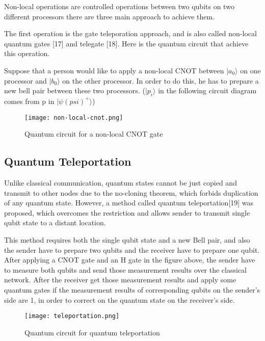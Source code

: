 Non-local operations are controlled operations between two qubits on two different processors there are three main approach to achieve them.

The first operation is the gate teleporation approach, and is also called non-local quantum gates [17] and telegate [18].  Here is the quantum circuit that achieve this operation.

Suppose that a person would like to apply a non-local CNOT between $|a_0\rangle$ on one processor and $|b_0\rangle$ on the other processor.  In order to do this, he has to prepare a new bell pair between these two processors.  ($|p_i\rangle$ in the following circuit diagram comes from p in $|\psi (psi)^+\rangle$)

 \begin{figure}[h]
  		\begin{center}
  			\texttt{[image: non-local-cnot.png]}
			\caption{Quantum circuit for a non-local CNOT gate}
			\label{Fig1}
		\end{center}
	\end{figure}
	
\newpage

\subsection{Quantum Teleportation}

  Unlike classical communication, quantum states cannot be just copied and transmit to other nodes due to the no-cloning theorem, which forbids duplication of any quantum state.  However, a method called quantum teleportation[19] was proposed, which overcomes the restriction and allows sender to transmit single qubit state to a distant location. 
 		
This method requires both the single qubit state and a new Bell pair, and also the sender have to prepare two qubits and the receiver have to prepare one qubit.  After applying a CNOT gate and an H gate in the figure above, the sender have to measure both qubits and send those measurement results over the classical network.  After the receiver get those measurement results and apply some quantum gates if the measurement results of corresponding qubits on the sender's side are 1, in order to correct on the quantum state on the receiver's side.

	\begin{figure}[h]
  		\begin{center}
  			\texttt{[image: teleportation.png]}
			\caption{Quantum circuit for quantum teleportation}
			\label{Fig2}
		\end{center}
	\end{figure}
\newpage
